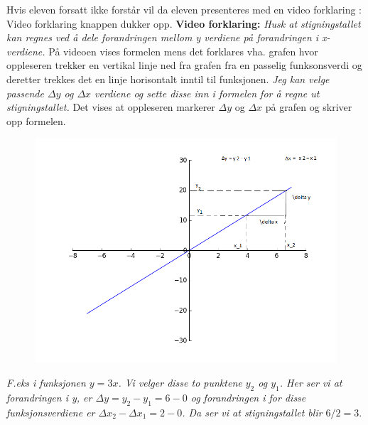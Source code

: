 \documentclass[12pt,twoside,onecolumn]{article}
\begin{document}
\begin{Exercise}
\begin{figure}[h!]
\begin{subfigure}{.5\textwidth}
    \end{subfigure}
\end{figure}
{\color{Maroon}Hvis eleven forsatt ikke forstår vil da eleven presenteres med en video forklaring :  Video forklaring knappen dukker opp.}
\newline
\newline
\textbf{Video forklaring:}
\newline\newline
{\emph{\color{gray}
Husk at stigningstallet kan regnes ved å dele forandringen mellom y verdiene på forandringen i x-verdiene.}} 
\newline
{\color{PineGreen} På videoen vises formelen mens det forklares vha. grafen hvor oppleseren trekker en vertikal linje ned fra grafen fra en passelig funksonsverdi og deretter trekkes det en linje horisontalt inntil til funksjonen.} \newline\newline
{\emph{\color{gray}
Jeg kan velge passende $\Delta y$ og $\Delta x$ verdiene og sette disse inn i formelen for å regne ut stigningstallet.}} \newline
{\color{PineGreen} Det vises at oppleseren markerer $\Delta y$ og $\Delta x$ på grafen og skriver opp formelen.} 
\begin{figure}[h!]
\centering
\includegraphics[scale = 0.6]{figures/stigningstallet.png}
\end{figure}
\newline\newline
{\emph{\color{gray}
F.eks i funksjonen $y = 3x$. Vi velger disse to punktene $y_2$ og $y_1$. Her ser vi at forandringen i y, er $\Delta y = y_2 - y_1 = 6- 0$ og forandringen i for disse funksjonsverdiene er $\Delta x_2 - \Delta x_1 = 2 - 0$. Da ser vi at stigningstallet blir $6/2 = 3.$}} \newline

\end{Exercise}
\end{document}
